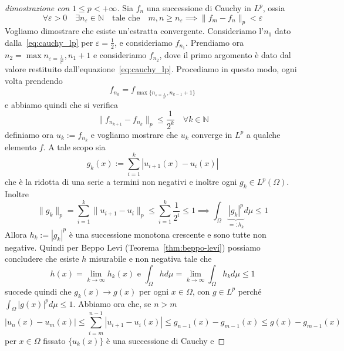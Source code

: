 \begin{proof}[dimostrazione con \(1 \le p < +\infty\)]
    Sia \(f_{n}\) una successione di Cauchy in \(L^{p}\), ossia
    \begin{equation}\label{eq:cauchy_lp}
        \forall \varepsilon > 0 \quad \exists n_\varepsilon \in \mathbb{N} \quad
        \text{tale che} \quad m, n \ge n_\varepsilon \implies \|f_{m} -
        f_{n}\|_{p} < \varepsilon
    \end{equation}
    Vogliamo dimostrare che esiste un'estratta convergente. Consideriamo
    l'\(n_{1} \) dato dalla~\eqref{eq:cauchy_lp} per \(\varepsilon = \frac{1}{2}\), e
    consideriamo \(f_{n_{1} } \). Prendiamo ora \(n_{2} =
    \max{n_{\varepsilon = \frac{1}{2^2}}, n_{1}+1}\) e consideriamo \(f_{n_{2}}\), dove il primo argomento è dato dal valore restituito
    dall'equazione~\ref{eq:cauchy_lp}. Procediamo in questo modo, ogni volta
    prendendo
    \[
    f_{n_k} = f_{\max\{n_{\varepsilon = \frac{1}{2^k}}, n_{k-1} + 1\}}
    \]
    e abbiamo quindi che si verifica
    \[
        \|f_{n_{k+1}} - f_{n_k} \|_p \le \frac{1}{2^{k}} \quad \forall k \in \mathbb{N}
    \]
    definiamo ora \(u_k := f_{n_k} \) e vogliamo mostrare che \(u_k\) converge
    in \(L^{p}\) a qualche elemento \(f\). A tale scopo sia
    \[
        g_k(x) := \sum_{i=1}^{k} \left| u_{i+1} {(x)} - u_{i}{(x)} \right|  
    \]
    che è la ridotta di una serie a termini non negativi e inoltre ogni \(g_k
    \in L^{p}(\Omega)\). Inoltre
    \[
        \|g_k\|_p = \sum_{i=1}^{k} \|u_{i+1} -u_{i}\|_p \le \sum_{i=1}^{k}
        \frac{1}{2^{i}} \le 1 \implies \int_{\Omega} \underbrace{\left| g_k
        \right|^{p}}_{=:h_k} d\mu
        \le 1
    \]
    Allora \(h_k := |g_k|^{p}\) è una successione monotona crescente e sono
    tutte non negative. Quindi per Beppo Levi (Teorema~\ref{thm:beppo-levi})
possiamo concludere che esiste \(h\) misurabile e non negativa tale
che 
\[
    h(x) = \lim_{k\to \infty} h_k(x) \text{ e } \int_{\Omega} h d\mu =
    \lim_{k\to \infty} \int_{\Omega} h_k d\mu \le 1
\]
succede quindi che \(g_k(x) \to g(x)\) per ogni \(x \in \Omega\), con \(g \in
L^{p}\) perché \(\int_{\Omega} |g(x)|^{p} d\mu \le 1 \).
Abbiamo ora che, se \(n > m\) 
\begin{equation}\label{eq:cauchy_lp_pf1}
    \left| u_n(x) - u_{m}{(x)} \right| \le \sum_{i=m}^{n-1} \left| u_{i+1}
    -u_{i}{(x)} \right| \le g_{n-1} {(x)} - g_{m-1}{(x)} \le g(x) - g_{m-1} {(x)}
\end{equation}
per \(x \in \Omega\) fissato \(\{u_{k} {(x)}\} \) è una successione di Cauchy e

\end{proof}
